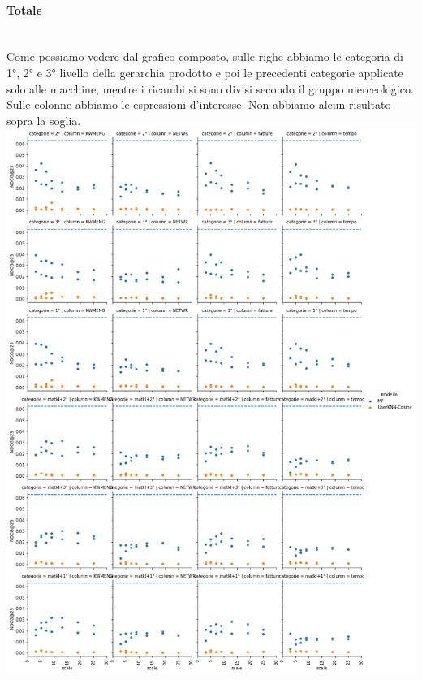 \paragraph{Totale}\mbox{} \\
Come possiamo vedere dal grafico composto, sulle righe abbiamo le categoria di 1°, 2° e 3° livello della gerarchia prodotto e poi le precedenti categorie applicate solo alle macchine, mentre i ricambi si sono divisi secondo il gruppo merceologico. Sulle colonne abbiamo le espressioni d'interesse. Non abbiamo alcun risultato sopra la soglia.\\

\includegraphics[width=16cm]{figures/risultati_ordered_categoria_totale.png}


